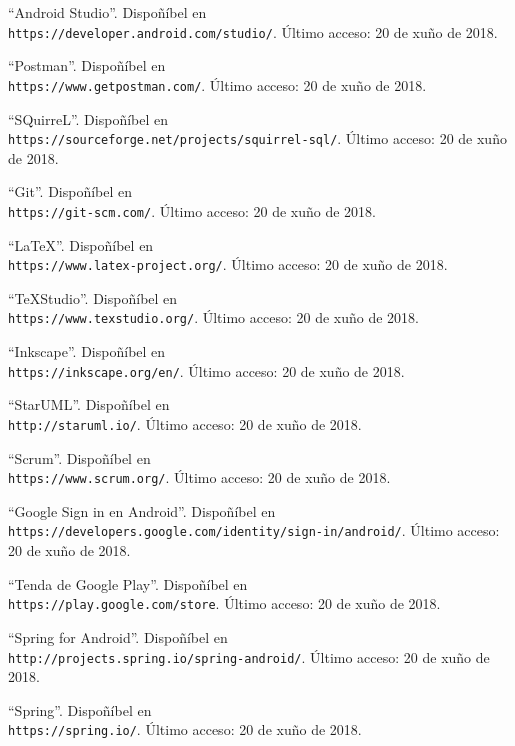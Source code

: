 \documentclass[11pt, a4paper, twoside, titlepage]{book}
\begin{document}
\begin{thebibliography}{9}
	``Android Studio''. Dispoñíbel en \\\texttt{https://developer.android.com/studio/}. Último acceso: 20 de xuño de 2018.
	
	``Postman''. Dispoñíbel en \\\texttt{https://www.getpostman.com/}. Último acceso: 20 de xuño de 2018.
	
	``SQuirreL''. Dispoñíbel en \\\texttt{https://sourceforge.net/projects/squirrel-sql/}. Último acceso: 20 de xuño de 2018.
	
	``Git''. Dispoñíbel en \\\texttt{https://git-scm.com/}. Último acceso: 20 de xuño de 2018.
	
	``LaTeX''. Dispoñíbel en \\\texttt{https://www.latex-project.org/}. Último acceso: 20 de xuño de 2018.
	
	``TeXStudio''. Dispoñíbel en \\\texttt{https://www.texstudio.org/}. Último acceso: 20 de xuño de 2018.
	
	``Inkscape''. Dispoñíbel en \\\texttt{https://inkscape.org/en/}. Último acceso: 20 de xuño de 2018.
	
	``StarUML''. Dispoñíbel en \\\texttt{http://staruml.io/}. Último acceso: 20 de xuño de 2018.
	
	``Scrum''. Dispoñíbel en \\\texttt{https://www.scrum.org/}. Último acceso: 20 de xuño de 2018.
	
	``Google Sign in en Android''. Dispoñíbel en \\\texttt{https://developers.google.com/identity/sign-in/android/}. Último acceso: 20 de xuño de 2018.
	
	``Tenda de Google Play''. Dispoñíbel en \\\texttt{https://play.google.com/store}. Último acceso: 20 de xuño de 2018.
	
	``Spring for Android''. Dispoñíbel en \\\texttt{http://projects.spring.io/spring-android/}. Último acceso: 20 de xuño de 2018.
	
	``Spring''. Dispoñíbel en \\\texttt{https://spring.io/}. Último acceso: 20 de xuño de 2018.
	

\end{thebibliography}
\end{document}
